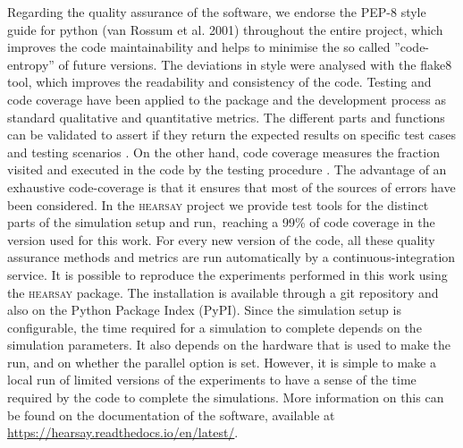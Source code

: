 \documentclass[crop]{CSLB}
\newcommand{\hs}{\textsc{hearsay}}
\begin{document}
%
Regarding the quality assurance of the software, we endorse the PEP-8
style guide for python (van Rossum et al. 2001) throughout the entire
project, which improves the code maintainability and helps to minimise
the so called ''code-entropy'' of future versions.
%
The deviations in style were analysed with the flake8 tool, which
improves the readability and consistency of the code.
%
Testing and code coverage have been applied to the package and the
development process as standard qualitative and quantitative metrics.
%
The different parts and functions can be validated to assert if they
return the expected results on specific test cases and testing
scenarios \citep{jazayeri_engeneering_2007}.
%
On the other hand, code coverage measures the fraction visited and
executed in the code by the testing procedure
\citep{miller_testing_1963}.
%
The advantage of an exhaustive code-coverage is that it ensures that
most of the sources of errors have been considered.
%
In the \hs{} project we provide test tools for the distinct parts of
the simulation setup and run, reaching a 99\% of code coverage in the
version used for this work.
%
For every new version of the code, all these quality assurance methods
and metrics are run automatically by a continuous-integration service.
%
It is possible to reproduce the experiments performed in this work
using the \hs{} package.
%
The installation is available through a git repository and also on the
Python Package Index (PyPI).
%
Since the simulation setup is configurable, the time required for a
simulation to complete depends on the simulation parameters.
%
It also depends on the hardware that is used to make the run, and on whether the parallel option is set.
%
However, it is simple to make a local run of limited versions of the experiments to have a sense of the time required by
the code to complete the simulations.
%
More information on this can be found on the documentation of the software, available at
\url{https://hearsay.readthedocs.io/en/latest/}.

\end{document}
